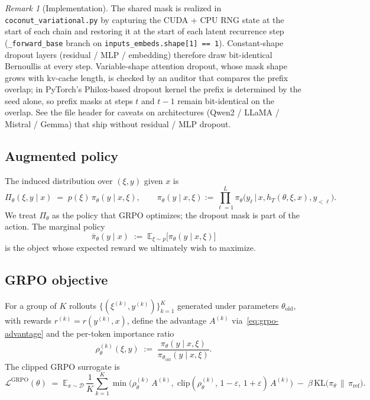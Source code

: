 \documentclass[11pt]{article}
\theoremstyle{definition}
\theoremstyle{remark}
\newtheorem{remark}[theorem]{Remark}
\newcommand{\E}{\mathbb{E}}
\newcommand{\KL}{\mathrm{KL}}
\newcommand{\D}{\mathcal{D}}
\newcommand{\Loss}{\mathcal{L}}
\newcommand{\eps}{\varepsilon}
\newcommand{\old}{\mathrm{old}}
\begin{document}
\begin{remark}[Implementation]
The shared mask is realized in \texttt{coconut\_variational.py} by
capturing the CUDA + CPU RNG state at the start of each chain and
restoring it at the start of each latent recurrence step
(\texttt{\_forward\_base} branch on \texttt{inputs\_embeds.shape[1] == 1}).
Constant-shape dropout layers (residual / MLP / embedding) therefore draw
bit-identical Bernoullis at every step.  Variable-shape attention dropout,
whose mask shape grows with kv-cache length, is checked by an auditor
that compares the prefix overlap; in PyTorch's Philox-based dropout
kernel the prefix is determined by the seed alone, so prefix masks at
steps $t$ and $t-1$ remain bit-identical on the overlap.  See the file
header for caveats on architectures (Qwen2 / LLaMA / Mistral / Gemma)
that ship without residual / MLP dropout.
\end{remark}

\subsection{Augmented policy}
The induced distribution over $(\xi, y)$ given $x$ is
\begin{equation}
\Pi_\theta(\xi, y \mid x)
   \;=\; p(\xi) \, \pi_\theta(y \mid x, \xi),
\qquad
\pi_\theta(y \mid x, \xi)
  := \prod_{\ell=1}^{L} \pi_\theta\!\big(y_\ell \,\big|\, x, h_T(\theta,\xi,x), y_{<\ell}\big).
\label{eq:augmented-policy}
\end{equation}
We treat $\Pi_\theta$ as the policy that GRPO optimizes; the dropout mask
is part of the action.  The marginal policy
\begin{equation}
\bar\pi_\theta(y \mid x)
  \;:=\; \E_{\xi \sim p}\!\big[\pi_\theta(y \mid x, \xi)\big]
\label{eq:marginal-policy}
\end{equation}
is the object whose expected reward we ultimately wish to maximize.

\subsection{GRPO objective}

For a group of $K$ rollouts $\{(\xi^{(k)}, y^{(k)})\}_{k=1}^K$ generated
under parameters $\theta_\old$, with rewards $r^{(k)} = r(y^{(k)}, x)$,
define the advantage $A^{(k)}$ via~\eqref{eq:grpo-advantage} and the
per-token importance ratio
\begin{equation}
\rho_\theta^{(k)}(\xi, y)
  \;:=\;
\frac{\pi_\theta(y \mid x, \xi)}{\pi_{\theta_\old}(y \mid x, \xi)}.
\end{equation}
The clipped GRPO surrogate is
\begin{equation}
\Loss^{\mathrm{GRPO}}(\theta)
  \;=\;
\E_{x \sim \D}\,
\frac{1}{K}\sum_{k=1}^{K}
  \min\!\Big(
    \rho_\theta^{(k)}\, A^{(k)}, \;
    \mathrm{clip}(\rho_\theta^{(k)},\,1-\eps,\,1+\eps)\,A^{(k)}
  \Big)
  \;-\;\beta\,\KL\!\big(\pi_{\theta}\,\big\|\,\pi_{\mathrm{ref}}\big).
\label{eq:grpo-loss}
\end{equation}
\end{document}
